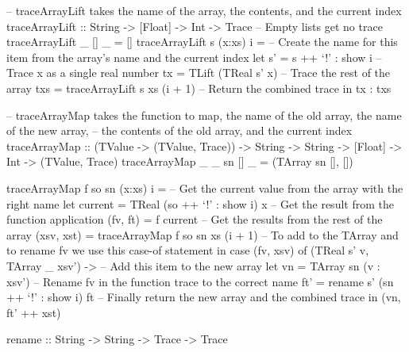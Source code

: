         \begin{haskell}[caption=Tracing array instantiation and array mapping, label=lst:trace_map, gobble=12]
            -- traceArrayLift takes the name of the array, the contents, and the current index
            traceArrayLift :: String -> [Float] -> Int -> Trace
            -- Empty lists get no trace
            traceArrayLift _ []     _ = []
            traceArrayLift s (x:xs) i = 
                -- Create the name for this item from the array's name and the current index
                let s' = s ++ `!' : show i
                -- Trace x as a single real number
                    tx = TLift (TReal s' x)
                -- Trace the rest of the array
                    txs = traceArrayLift s xs (i + 1)
                -- Return the combined trace
                in  tx : txs

            -- traceArrayMap takes the function to map, the name of the old array, the name of the new array, 
            -- the contents of the old array, and the current index
            traceArrayMap :: (TValue -> (TValue, Trace)) -> String -> String -> [Float]
                -> Int -> (TValue, Trace)
            traceArrayMap _ _  sn []     _ = (TArray sn [], [])
            
            traceArrayMap f so sn (x:xs) i =
                -- Get the current value from the array with the right name
                let current  = TReal (so ++ `!' : show i) x
                -- Get the result from the function application
                    (fv, ft) = f current
                -- Get the results from the rest of the array
                    (xsv, xst) = traceArrayMap f so sn xs (i + 1)
                -- To add to the TArray and to rename fv we use this case-of statement
                in  case (fv, xsv) of
                    (TReal s' v, TArray _ xsv') ->
                        -- Add this item to the new array
                        let vn = TArray sn (v : xsv')
                        -- Rename fv in the function trace to the correct name
                            ft' = rename s' (sn ++ `!' : show i) ft
                        -- Finally return the new array and the combined trace
                        in  (vn, ft' ++ xst)

            rename :: String -> String -> Trace -> Trace
        \end{haskell}

